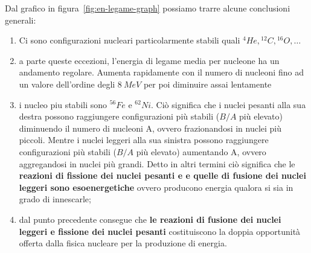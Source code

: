 Dal grafico in figura~\ref{fig:en-legame-graph} possiamo trarre alcune conclusioni generali:
\begin{enumerate}
	\item Ci sono configurazioni nucleari particolarmente stabili quali ${}^{4}He, {}^{12}_{}C, {}^{16}_{}O, \dots$
	\item a parte queste eccezioni, l'energia di legame media per nucleone ha un andamento regolare.
	      Aumenta rapidamente con il numero di nucleoni fino ad un valore dell'ordine degli $8 \ MeV$ per poi diminuire assai lentamente
	\item i nucleo piu stabili sono ${}^{56}_{}Fe$ e ${}^{62}_{}Ni$.
	Ciò significa che i nuclei pesanti alla sua destra possono raggiungere configurazioni più stabili ($B/A$ più elevato) diminuendo il numero di nucleoni A, ovvero frazionandosi in nuclei più piccoli.
	Mentre i nuclei leggeri alla sua sinistra possono raggiungere configurazioni più stabili ($B/A$ più elevato) aumentando A, ovvero aggregandosi in nuclei più grandi.
	Detto in altri termini ciò significa che le \textbf{reazioni di fissione dei nuclei pesanti e e quelle di fusione dei nuclei
	leggeri sono esoenergetiche} ovvero producono energia qualora si sia in grado di innescarle;
	\item dal punto precedente consegue che \textbf{le reazioni di fusione dei nuclei leggeri e fissione dei nuclei pesanti} costituiscono la doppia opportunità offerta dalla fisica nucleare per la produzione di energia.
\end{enumerate}

